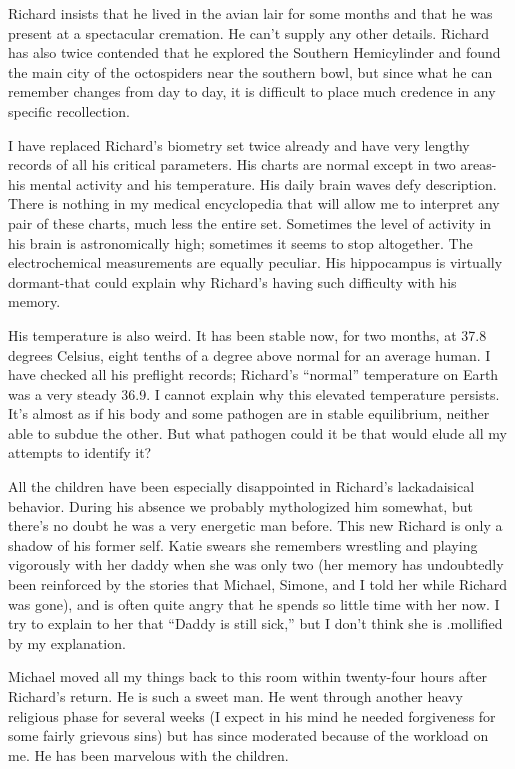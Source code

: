 \documentclass[]{article}
\begin{document}
{Richard insists that he lived in the avian lair for some months and that he was present at a spectacular cremation.  He can’t supply any other details.  Richard has also twice contended that he explored the Southern Hemicylinder and found the main city of the octospiders near the southern bowl, but since what he can remember changes from day to day, it is difficult to place much credence in any specific recollection.

I have replaced Richard’s biometry set twice already and have very lengthy records of all his critical parameters.  His charts are normal except in two areas-his mental activity and his temperature.  His daily brain waves defy description.  There is nothing in my medical encyclopedia that will allow me to interpret any pair of these charts, much less the entire set.  Sometimes the level of activity in his brain is astronomically high; sometimes it seems to stop altogether.  The electrochemical measurements are equally peculiar.  His hippocampus is virtually dormant-that could explain why Richard’s having such difficulty with his memory.

His temperature is also weird.  It has been stable now, for two months, at 37.8 degrees Celsius, eight tenths of a degree above normal for an average human.  I have checked all his preflight records; Richard’s “normal” temperature on Earth was a very steady 36.9.  I cannot explain why this elevated temperature persists.  It’s almost as if his body and some pathogen are in stable equilibrium, neither able to subdue the other.  But what pathogen could it be that would elude all my attempts to identify it?

All the children have been especially disappointed in Richard’s lackadaisical behavior.  During his absence we probably mythologized him somewhat, but there’s no doubt he was a very energetic man before.  This new Richard is only a shadow of his former self.  Katie swears she remembers wrestling and playing vigorously with her daddy when she was only two (her memory has undoubtedly been reinforced by the stories that Michael, Simone, and I told her while Richard was gone), and is often quite angry that he spends so little time with her now.  I try to explain to her that “Daddy is still sick,” but I don’t think she is .mollified by my explanation.

Michael moved all my things back to this room within twenty-four hours after Richard’s return.  He is such a sweet man.  He went through another heavy religious phase for several weeks (I expect in his mind he needed forgiveness for some fairly grievous sins) but has since moderated because of the workload on me.  He has been marvelous with the children.

}
\end{document}
